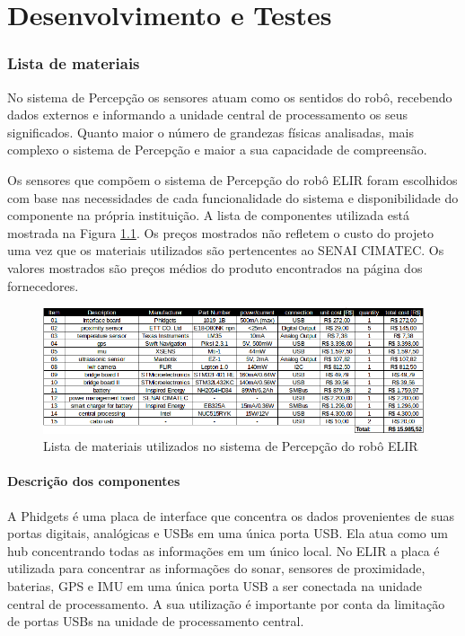 \chapter{Desenvolvimento e Testes}
\label{chap:result}




\subsection{Lista de materiais}
No sistema de Percepção os sensores atuam como os sentidos do robô, recebendo dados externos e informando a unidade central de processamento os seus significados. Quanto maior o número de grandezas físicas analisadas, mais complexo o sistema de Percepção e maior a sua capacidade de compreensão.

Os sensores que compõem o sistema de Percepção do robô ELIR foram escolhidos com base nas necessidades de cada funcionalidade do sistema e disponibilidade do componente na própria instituição. A lista de componentes utilizada está mostrada na Figura \ref{fig:list_mat}. Os preços mostrados não refletem o custo do projeto uma vez que os materiais utilizados são pertencentes ao SENAI CIMATEC. Os valores mostrados são preços médios do produto encontrados na página dos fornecedores.

\begin{figure}[h]
    \centering
    \includegraphics[width=16cm]{Figures/lista_materiais.png}
    \caption{Lista de materiais utilizados no sistema de Percepção do robô ELIR}
    \label{fig:list_mat}
\end{figure}

\subsubsection{Descrição dos componentes}

A Phidgets é uma placa de interface que concentra os dados provenientes de suas portas digitais, analógicas e USBs em uma única porta USB. Ela atua como um hub concentrando todas as informações em um único local. No ELIR a placa é utilizada para concentrar as informações do sonar, sensores de proximidade,  baterias, GPS e IMU em uma única porta USB a ser conectada na unidade central de processamento. A sua utilização é importante por conta da limitação de portas USBs na unidade de processamento central.

